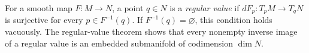 
For a smooth map $F:M\to N$, a point $q\in N$ is a \emph{regular value} if $dF_p:T_pM\to T_qN$ is surjective for every $p\in F^{-1}(q)$. If $F^{-1}(q)=\varnothing$, this condition holds vacuously. The regular-value theorem shows that every nonempty inverse image of a regular value is an embedded submanifold of codimension $\dim N$.
